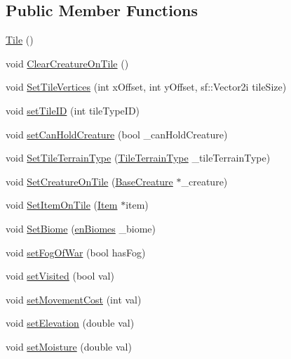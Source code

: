 \subsection*{Public Member Functions}
\begin{DoxyCompactItemize}
\item 
\mbox{\hyperlink{class_tile_aeeb5593bb6b75aae2edfcccbc84ab378}{Tile}} ()
\item 
void \mbox{\hyperlink{class_tile_a44269537d2d95251f5d6320f11afaf71}{Clear\+Creature\+On\+Tile}} ()
\item 
void \mbox{\hyperlink{class_tile_ae04b87313b96914391ca2ffc2eb9f5c1}{Set\+Tile\+Vertices}} (int x\+Offset, int y\+Offset, sf\+::\+Vector2i tile\+Size)
\item 
void \mbox{\hyperlink{class_tile_a833ab61d8e2bf2ed210c25ebf9e58f0a}{set\+Tile\+ID}} (int tile\+Type\+ID)
\item 
void \mbox{\hyperlink{class_tile_adac9bd5918f12cd0797c36db1e608e44}{set\+Can\+Hold\+Creature}} (bool \+\_\+can\+Hold\+Creature)
\item 
void \mbox{\hyperlink{class_tile_a611e25f67b8504a33f373893e26e902c}{Set\+Tile\+Terrain\+Type}} (\mbox{\hyperlink{_enum_types_8hpp_a462b3f8c270b48544fc9c2e167a3f6e5}{Tile\+Terrain\+Type}} \+\_\+tile\+Terrain\+Type)
\item 
void \mbox{\hyperlink{class_tile_a2975ab14bb24641a095196c34ca42e74}{Set\+Creature\+On\+Tile}} (\mbox{\hyperlink{class_base_creature}{Base\+Creature}} $\ast$\+\_\+creature)
\item 
void \mbox{\hyperlink{class_tile_aa53f4f2b54ce9a66abf75284a304c1df}{Set\+Item\+On\+Tile}} (\mbox{\hyperlink{class_item}{Item}} $\ast$item)
\item 
void \mbox{\hyperlink{class_tile_a260d7e1e28ffab1cac88fcce8b2fa438}{Set\+Biome}} (\mbox{\hyperlink{_enum_types_8hpp_a5c2255009cd01c90cf68245e6f453d1c}{en\+Biomes}} \+\_\+biome)
\item 
void \mbox{\hyperlink{class_tile_a3ff149871212dea894dd8e4f6cfe26af}{set\+Fog\+Of\+War}} (bool has\+Fog)
\item 
void \mbox{\hyperlink{class_tile_a72c64bbb075c641ed1af3b4d669d39ea}{set\+Visited}} (bool val)
\item 
void \mbox{\hyperlink{class_tile_a825e527d44d08cd73b354d214eaa189d}{set\+Movement\+Cost}} (int val)
\item 
void \mbox{\hyperlink{class_tile_a4037e18197615a94312b6a0bc73fe2ec}{set\+Elevation}} (double val)
\item 
void \mbox{\hyperlink{class_tile_a8dc53f1b24e6dee587664ced90c3ac79}{set\+Moisture}} (double val)

\end{DoxyCompactItemize}
